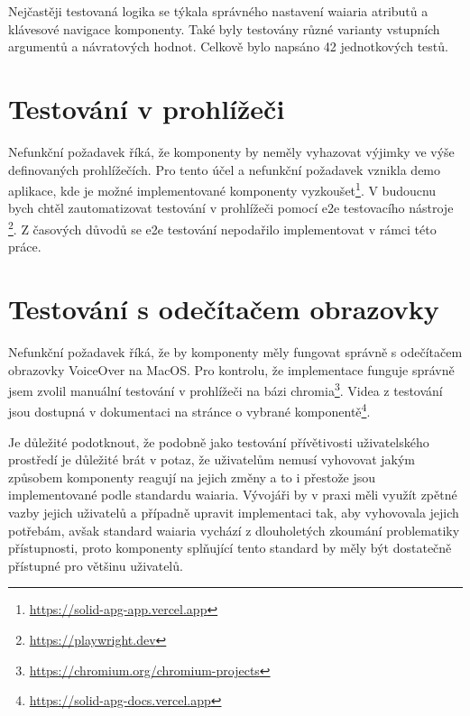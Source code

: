 Nejčastěji testovaná logika se týkala správného nastavení \gls{waiaria} atributů a klávesové navigace komponenty.
Také byly testovány různé varianty vstupních argumentů a návratových hodnot.
Celkově bylo napsáno 42 jednotkových testů.

\section{Testování v prohlížeči}\label{chapter:browser-testing}

Nefunkční požadavek \hyperref[nfr11]{} říká, že komponenty by neměly vyhazovat výjimky ve výše definovaných prohlížečích.
Pro tento účel a nefunkční požadavek \hyperref[nfr15]{} vznikla demo aplikace, kde je možné implementované komponenty vyzkoušet\footnote{\url{https://solid-apg-app.vercel.app}}.
V budoucnu bych chtěl zautomatizovat testování v prohlížeči pomocí \gls{e2e} testovacího nástroje \footnote{\url{https://playwright.dev}}.
Z časových důvodů se \gls{e2e} testování nepodařilo implementovat v rámci této práce.

\section{Testování s odečítačem obrazovky}

Nefunkční požadavek \hyperref[nfr12]{} říká, že by komponenty měly fungovat správně s odečítačem obrazovky VoiceOver na MacOS.
Pro kontrolu, že implementace funguje správně jsem zvolil manuální testování v prohlížeči na bázi chromia\footnote{\url{https://chromium.org/chromium-projects}}.
Videa z testování jsou dostupná v dokumentaci na stránce o vybrané komponentě\footnote{\url{https://solid-apg-docs.vercel.app}}.

Je důležité podotknout, že podobně jako testování přívětivosti uživatelského prostředí je důležité brát v potaz, že uživatelům nemusí vyhovovat jakým způsobem komponenty reagují na jejich změny a to i přestože jsou implementované podle standardu \gls{waiaria}.
Vývojáři by v praxi měli využít zpětné vazby jejich uživatelů a případně upravit implementaci tak, aby vyhovovala jejich potřebám, avšak standard \gls{waiaria} vychází z dlouholetých zkoumání problematiky přístupnosti, proto komponenty splňující tento standard by měly být dostatečně přístupné pro většinu uživatelů.

